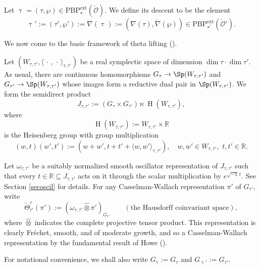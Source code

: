 \documentclass[11pt,a4paper]{amsart}
\newcommand{\CO}{{\mathcal {O}}}
\newcommand{\oH}{\operatorname{H}}
\newcommand{\R}{\mathbb R}
\def\DD{\nabla}
\newcommand{\la}{\langle}
\newcommand{\ra}{\rangle}
\numberwithin{equation}{section}
\theoremstyle{remark}
\def\subset{\subseteq}
\def\PBPes{\mathrm{PBP}^{\mathrm{ext}}_{\star}}
\def\ckDD{{\check\DD}}
\def\PBP{\mathrm{PBP}}
\begin{document}
Let  $\uptau = (\tau,\wp)\in \mathrm{\PBPes}(\check \CO)$.  We define its  descent to be the element
 \[
  \uptau' := (\tau',\wp'):=\nabla(\uptau):= (\DD(\tau), \ckDD(\wp))\in \mathrm{\PBP}^{\mathrm{ext}}_{\star'}(\check \CO').
 \]


We now come to the basic framework of theta lifting (\cite{Howe79, Howe89}). 

Let $(W_{\tau, \tau'}, \la \,\cdot\,,\,\cdot\,\ra_{\tau, \tau'})$ be a real symplectic space of  dimension $\dim \tau\cdot \dim \tau'$. As usual, there are continuous homomorphisms $G_\tau\rightarrow \Sp(W_{\tau, \tau'})$ and $G_{\tau'}\rightarrow \Sp(W_{\tau, \tau'})$ whose images form a reductive dual pair in $\Sp(W_{\tau, \tau'})$. We form the semidirect product
   \[
   J_{\tau, \tau'}:=(G_\tau\times G_{\tau'})\ltimes \oH(W_{\tau, \tau'}),
   \]
   where
  \[
  \oH(W_{\tau, \tau'}):=W_{\tau, \tau'}\times \R
  \]
  is the Heisenberg group with group multiplication
  \[
  (w,t)(w',t'):=(w+w', t+t'+\la w,w'\ra_{\tau, \tau'}), \quad
  w,w'\in W_{\tau, \tau'},\,\,t,t'\in \R.
 \]

 Let $\omega_{\tau, \tau'}$ be a suitably normalized smooth oscillator representation of $J_{\tau, \tau'}$ such that every $t\in \R\subset J_{\tau, \tau'}$ acts on it through the scalar multiplication by $e^{\sqrt{-1}\, t}$. See Section \ref{secoscil} for details. 
  For any Casselman-Wallach representation $\pi'$ of $G_{\tau'}$, write
 \[
   \check \Theta_{\tau'}^{\tau}(\pi'):=(\omega_{\tau, \tau'}\widehat \otimes \pi')_{G_{\tau'}} \qquad (\textrm{the Hausdorff coinvariant space}),
 \]
 where $\widehat \otimes$ indicates the complete projective tensor product. This representation is clearly Fr\'echet, smooth, and of moderate growth, and so a Casselman-Wallach representation by the fundamental result of Howe (\cite{Howe89}).

For notational convenience, we shall also write $G_{\uptau}:=G_{\tau}$ and $G_{\uptau'}:=G_{\tau'}$.
\end{document}
